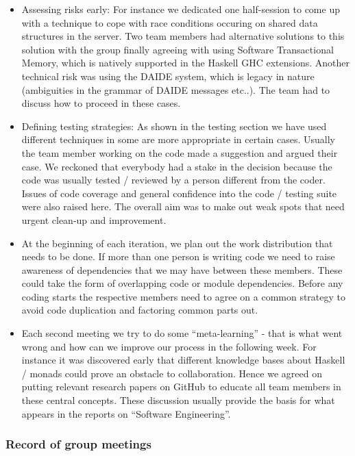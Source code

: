 \documentclass[11pt]{article} \usepackage{fullpage} \usepackage{cite}
\begin{document}
\begin{itemize}
\item Assessing risks early: For instance we dedicated one half-session to come
  up with a technique to cope with race conditions occuring on shared data
  structures in the server. Two team members had alternative solutions to this
  solution with the group finally agreeing with using Software Transactional
  Memory, which is natively supported in the Haskell GHC extensions. Another
  technical risk was using the DAIDE system, which is legacy in nature
  (ambiguities in the grammar of DAIDE messages etc..). The team had to discuss
  how to proceed in these cases.
\item Defining testing strategies: As shown in the testing section we have used
  different techniques in some are more appropriate in certain cases. Usually
  the team member working on the code made a suggestion and argued their case.
  We reckoned that everybody had a stake in the decision because the code was
  usually tested / reviewed by a person different from the coder. Issues of code
  coverage and general confidence into the code / testing suite were also raised
  here. The overall aim was to make out weak spots that need urgent clean-up and
  improvement.
\item At the beginning of each iteration, we plan out the work distribution that
  needs to be done. If more than one person is writing code we need to raise
  awareness of dependencies that we may have between these members. These could
  take the form of overlapping code or module dependencies. Before any coding
  starts the respective members need to agree on a common strategy to avoid code
  duplication and factoring common parts out.
\item Each second meeting we try to do some ``meta-learning'' - that is what
  went wrong and how can we improve our process in the following week. For
  instance it was discovered early that different knowledge bases about Haskell
  / monads could prove an obstacle to collaboration. Hence we agreed on putting
  relevant research papers on GitHub to educate all team members in these
  central concepts. These discussion usually provide the basis for what appears
  in the reports on ``Software Engineering''.

\end{itemize}


\subsubsection{Record of group meetings}
\end{document}
